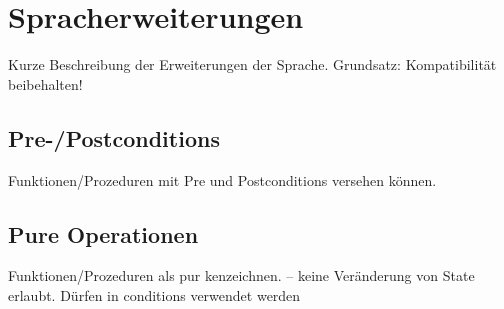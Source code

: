 \section{Spracherweiterungen}

Kurze Beschreibung der Erweiterungen der Sprache. Grundsatz: Kompatibilität beibehalten!

\subsection{Pre-/Postconditions}
Funktionen/Prozeduren mit Pre und Postconditions versehen können.

\subsection{Pure Operationen}
Funktionen/Prozeduren als pur kenzeichnen. -- keine Veränderung von State erlaubt. Dürfen in conditions verwendet werden




